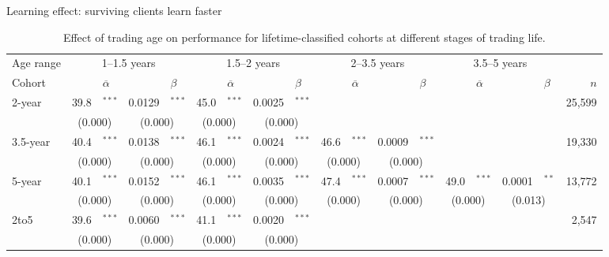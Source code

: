 \documentclass{beamer}
\begin{document}
\begin{frame}{Learning effect: surviving clients learn faster}
	\begin{table}[h!]
		\centering
		\caption{Effect of trading age on performance for lifetime-classified cohorts at different stages of trading life.}
		\tiny
		\setlength{\tabcolsep}{2pt}
    \begin{tabular}{lr@{}lr@{}lr@{}lr@{}lr@{}lr@{}lr@{}lr@{}lr}
	\toprule
	Age range & \multicolumn{4}{c}{1--1.5 years} & \multicolumn{4}{c}{1.5--2 years} & \multicolumn{4}{c}{2--3.5 years} & \multicolumn{4}{c}{3.5--5 years} &  \\
	Cohort      &  &  $\overline{\alpha}$     &       &  $\beta$     &       &    $\overline{\alpha}$   &       &  $\beta$      &       &  $\overline{\alpha}$    &       &   $\beta$     &       &   $\overline{\alpha}$    &       &    $\beta$         & $n$ \\
	\cmidrule(lr){2-5}  \cmidrule(lr){6-9}   \cmidrule(lr){10-13}   \cmidrule(lr){14-17}  \cmidrule(l){18-18}
	2-year &  39.8 &$^{***}$        &  0.0129     & $^{***}$       &       45.0&$^{***}$        &       0.0025 & $^{***}$       &       &       &       &       &       &       &       &       &   25,599 \\
	& \multicolumn{2}{c}{(0.000)} & \multicolumn{2}{c}{(0.000)} & \multicolumn{2}{c}{(0.000)} & \multicolumn{2}{c}{(0.000)}   &       &       &       &       &       &       &       &       &  \\
	\cmidrule{1-18}
	3.5-year &  40.4 &$^{***}$        &  0.0138      & $^{***}$    &   46.1&$^{***}$        &       0.0024 & $^{***}$       &     46.6& $^{***}$       &     0.0009 &$^{***}$      &       &       &       &       &   19,330 \\
	& \multicolumn{2}{c}{(0.000)} & \multicolumn{2}{c}{(0.000)} & \multicolumn{2}{c}{(0.000)} & \multicolumn{2}{c}{(0.000)}   &      \multicolumn{2}{c}{(0.000)}       & \multicolumn{2}{c}{(0.000)} &       &       &       &       &   \\
	\cmidrule{1-18}
	5-year &  40.1&$^{***}$        &  0.0152      & $^{***}$       &  46.1  &$^{***}$        &       0.0035 & $^{***}$       &   47.4& $^{***}$       &   0.0007 &$^{***}$      &       49.0& $^{***}$       &       0.0001 &  $^{**}$      &   13,772\\
	& \multicolumn{2}{c}{(0.000)} & \multicolumn{2}{c}{(0.000)} & \multicolumn{2}{c}{(0.000)} & \multicolumn{2}{c}{(0.000)}   &       \multicolumn{2}{c}{(0.000)}       &       \multicolumn{2}{c}{(0.000)}        &    \multicolumn{2}{c}{(0.000)}  &    \multicolumn{2}{c}{(0.013)}    &   \\
	\midrule
	2to5  &  39.6 &$^{***}$        &  0.0060        & $^{***}$       &  41.1&$^{***}$        &      0.0020 & $^{***}$       &       &       &   &     &       &       &       &      &   2,547\\
	& \multicolumn{2}{c}{(0.000)} & \multicolumn{2}{c}{(0.000)} & \multicolumn{2}{c}{(0.000)} & \multicolumn{2}{c}{(0.000)}   &       &       &       &       &       &       &       &       &   \\
	\bottomrule
\end{tabular}
\label{tab:regressrank}
\end{table}%


\end{frame}
\end{document}

